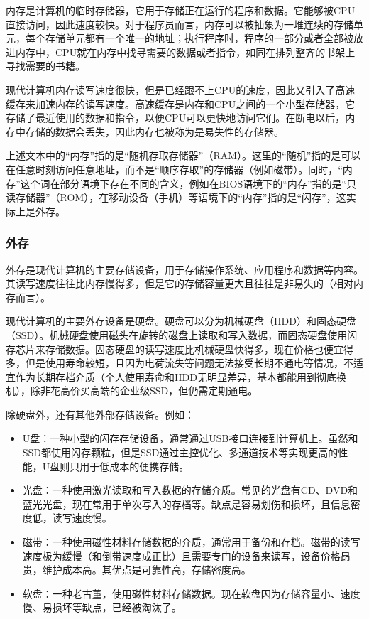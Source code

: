 \documentclass[../main.tex]{subfiles}
\begin{document}
内存是计算机的临时存储器，它用于存储正在运行的程序和数据。它能够被CPU直接访问，因此速度较快。对于程序员而言，内存可以被抽象为一堆连续的存储单元，每个存储单元都有一个唯一的地址；执行程序时，程序的一部分或者全部被放进内存中，CPU就在内存中找寻需要的数据或者指令，如同在排列整齐的书架上寻找需要的书籍。

现代计算机内存读写速度很快，但是已经跟不上CPU的速度，因此又引入了高速缓存来加速内存的读写速度。高速缓存是内存和CPU之间的一个小型存储器，它存储了最近使用的数据和指令，以便CPU可以更快地访问它们。在断电以后，内存中存储的数据会丢失，因此内存也被称为是易失性的存储器。

\begin{note}
  上述文本中的“内存”指的是“随机存取存储器”（RAM）。这里的“随机”指的是可以在任意时刻访问任意地址，而不是“顺序存取”的存储器（例如磁带）。同时，“内存”这个词在部分语境下存在不同的含义，例如在BIOS语境下的“内存”指的是“只读存储器”（ROM），在移动设备（手机）等语境下的“内存”指的是“闪存”，这实际上是外存。
\end{note}

\subsubsection{外存}

外存是现代计算机的主要存储设备，用于存储操作系统、应用程序和数据等内容。其读写速度往往比内存慢得多，但是它的存储容量更大且往往是非易失的（相对内存而言）。

现代计算机的主要外存设备是硬盘。硬盘可以分为机械硬盘（HDD）和固态硬盘（SSD）。机械硬盘使用磁头在旋转的磁盘上读取和写入数据，而固态硬盘使用闪存芯片来存储数据。固态硬盘的读写速度比机械硬盘快得多，现在价格也便宜得多，但是使用寿命较短，且因为电荷流失等问题无法接受长期不通电等情况，不适宜作为长期存档介质（个人使用寿命和HDD无明显差异，基本都能用到彻底换机），除非花高价买高端的企业级SSD，但仍需定期通电。

除硬盘外，还有其他外部存储设备。例如：
\begin{itemize}
  \item U盘：一种小型的闪存存储设备，通常通过USB接口连接到计算机上。虽然和SSD都使用闪存颗粒，但是SSD通过主控优化、多通道技术等实现更高的性能，U盘则只用于低成本的便携存储。
  \item 光盘：一种使用激光读取和写入数据的存储介质。常见的光盘有CD、DVD和蓝光光盘，现在常用于单次写入的存档等。缺点是容易划伤和损坏，且信息密度低，读写速度慢。
  \item 磁带：一种使用磁性材料存储数据的介质，通常用于备份和存档。磁带的读写速度极为缓慢（和倒带速度成正比）且需要专门的设备来读写，设备价格昂贵，维护成本高。其优点是可靠性高，存储密度高。
  \item 软盘：一种老古董，使用磁性材料存储数据。现在软盘因为存储容量小、速度慢、易损坏等缺点，已经被淘汰了。
\end{itemize}
\end{document}
